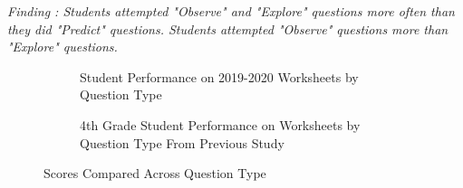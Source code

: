 {
\textit{Finding : Students attempted "Observe" and "Explore" questions more often than they did "Predict" questions. Students attempted "Observe" questions more than "Explore" questions.}

\begin{figure}
     \centering
     \begin{subfigure}[t]{0.49\textwidth}
        \caption{Student Performance on 2019-2020 \ts Worksheets by Question Type}
        \label{fig:observe_predict_explore}
    \end{subfigure}
    \hfill
    \begin{subfigure}[t]{0.49\textwidth}
        \caption{4th Grade Student Performance on \ts Worksheets by Question Type From Previous Study}
        \label{fig:observe_predict_explore_4th}
    \end{subfigure}
    \caption{\ts Scores Compared Across Question Type}
    

\end{figure}}
